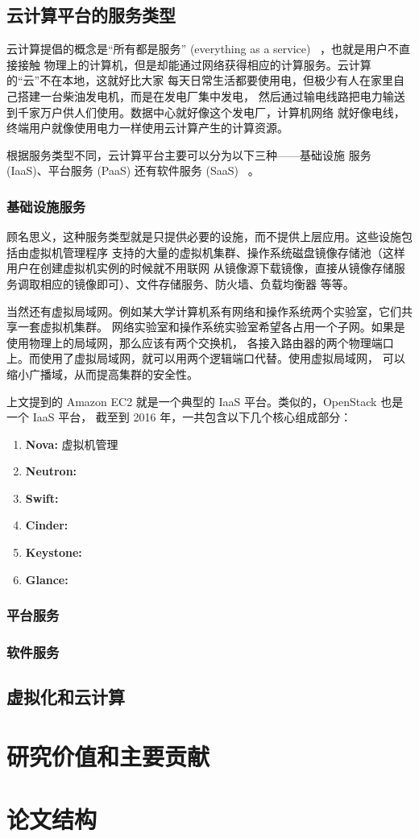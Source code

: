 \subsection{云计算平台的服务类型}

云计算提倡的概念是“所有都是服务”
 (everything as a service) ~\cite{cloud-and-openstack}，也就是用户不直接接触
物理上的计算机，但是却能通过网络获得相应的计算服务。云计算的“云”不在本地，这就好比大家
每天日常生活都要使用电，但极少有人在家里自己搭建一台柴油发电机，而是在发电厂集中发电，
然后通过输电线路把电力输送到千家万户供人们使用。数据中心就好像这个发电厂，计算机网络
就好像电线，终端用户就像使用电力一样使用云计算产生的计算资源。

根据服务类型不同，云计算平台主要可以分为以下三种——基础设施
服务 (IaaS)、平台服务 (PaaS) 还有软件服务 (SaaS) ~\cite{types-of-cloud}。

\subsubsection{基础设施服务}

顾名思义，这种服务类型就是只提供必要的设施，而不提供上层应用。这些设施包括由虚拟机管理程序
支持的大量的虚拟机集群、操作系统磁盘镜像存储池（这样用户在创建虚拟机实例的时候就不用联网
从镜像源下载镜像，直接从镜像存储服务调取相应的镜像即可）、文件存储服务、防火墙、负载均衡器
等等。

当然还有虚拟局域网。例如某大学计算机系有网络和操作系统两个实验室，它们共享一套虚拟机集群。
网络实验室和操作系统实验室希望各占用一个子网。如果是使用物理上的局域网，那么应该有两个交换机，
各接入路由器的两个物理端口上。而使用了虚拟局域网，就可以用两个逻辑端口代替。使用虚拟局域网，
可以缩小广播域，从而提高集群的安全性。

上文提到的 Amazon EC2 就是一个典型的 IaaS 平台。类似的，OpenStack 也是一个 IaaS 平台，
截至到 2016 年，一共包含以下几个核心组成部分：

\begin{enumerate}
    \item \textbf{Nova: }虚拟机管理
    \item \textbf{Neutron: }
    \item \textbf{Swift: }
    \item \textbf{Cinder: }
    \item \textbf{Keystone: }
    \item \textbf{Glance: }
\end{enumerate}


\subsubsection{平台服务}

\subsubsection{软件服务}

\subsection{虚拟化和云计算}

\section{研究价值和主要贡献}

\section{论文结构}

